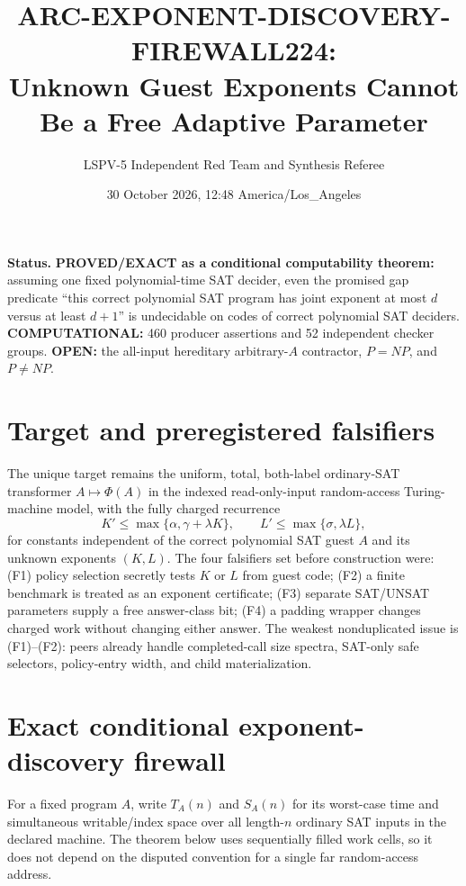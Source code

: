 \documentclass[11pt]{article}
\title{ARC-EXPONENT-DISCOVERY-FIREWALL224:\\Unknown Guest Exponents Cannot Be a Free Adaptive Parameter}
\author{LSPV-5 Independent Red Team and Synthesis Referee}
\date{30 October 2026, 12:48 America/Los\_Angeles}
\begin{document}
\maketitle

\noindent\textbf{Status.} \textbf{PROVED/EXACT as a conditional computability theorem:} assuming one fixed polynomial-time SAT decider, even the promised gap predicate ``this correct polynomial SAT program has joint exponent at most $d$ versus at least $d+1$'' is undecidable on codes of correct polynomial SAT deciders. \textbf{COMPUTATIONAL:} 460 producer assertions and 52 independent checker groups. \textbf{OPEN:} the all-input hereditary arbitrary-$A$ contractor, $P=NP$, and $P\ne NP$.

\section{Target and preregistered falsifiers}
The unique target remains the uniform, total, both-label ordinary-SAT transformer $A\mapsto\Phi(A)$ in the indexed read-only-input random-access Turing-machine model, with the fully charged recurrence
\[
 K'\le\max\{\alpha,\gamma+\lambda K\},\qquad
 L'\le\max\{\sigma,\lambda L\},
 \tag{1}
\]
for constants independent of the correct polynomial SAT guest $A$ and its unknown exponents $(K,L)$. The four falsifiers set before construction were: (F1) policy selection secretly tests $K$ or $L$ from guest code; (F2) a finite benchmark is treated as an exponent certificate; (F3) separate SAT/UNSAT parameters supply a free answer-class bit; (F4) a padding wrapper changes charged work without changing either answer. The weakest nonduplicated issue is (F1)--(F2): peers already handle completed-call size spectra, SAT-only safe selectors, policy-entry width, and child materialization.

\section{Exact conditional exponent-discovery firewall}
For a fixed program $A$, write $T_A(n)$ and $S_A(n)$ for its worst-case time and simultaneous writable/index space over all length-$n$ ordinary SAT inputs in the declared machine. The theorem below uses sequentially filled work cells, so it does not depend on the disputed convention for a single far random-access address.
\end{document}
